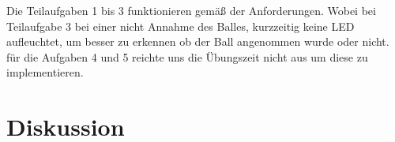 \documentclass[a4paper]{article}
\begin{document}
      Die Teilaufgaben 1 bis 3 funktionieren gemäß der Anforderungen. Wobei bei Teilaufgabe 3 bei einer nicht Annahme des Balles, kurzzeitig keine LED aufleuchtet, um besser zu erkennen ob der Ball angenommen wurde oder nicht.\\
      für die Aufgaben 4 und 5 reichte uns die Übungszeit nicht aus um diese zu implementieren.

    \section{Diskussion}

    \newpage
    \listoffigures
    \listoftables
\end{document}
